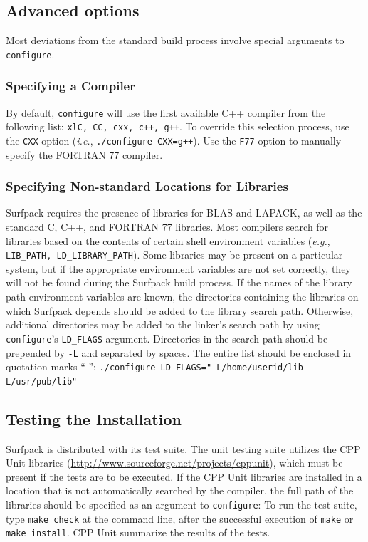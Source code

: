 \documentclass{article}
\begin{document}
\subsection{Advanced options}\label{sec:advancedinstall}
Most deviations from the standard build process involve special arguments to
\texttt{configure}.
\subsubsection{Specifying a Compiler}
By default, \texttt{configure} will use the first available C++ compiler from the
following list: \texttt{xlC, CC, cxx, c++, g++}.  To override this selection process, use
the \texttt{CXX} option ({\em i.e.}, \texttt{./configure CXX=g++}).  Use the \texttt{F77} option to manually specify the FORTRAN 77 compiler.

\subsubsection{Specifying Non-standard Locations for Libraries}
Surfpack requires the presence of libraries for BLAS and LAPACK, as well as the
standard C, C++, and FORTRAN 77 libraries.  Most compilers search for libraries
based on the contents of certain shell environment variables ({\em e.g.}, \texttt{LIB\_PATH,
LD\_LIBRARY\_PATH}).  Some libraries may be present on a particular system, but
if the appropriate environment variables are not set correctly, they will not be
found during the Surfpack build process.  If the names of the library path
environment variables are known, the directories containing the libraries on
which Surfpack depends should be added to the library search path.  Otherwise,
additional directories may be added to the linker's search path by using
\texttt{configure}'s \texttt{LD\_FLAGS} argument.  Directories in the search path should be
prepended by \texttt{-L} and separated by spaces.  The entire list should be enclosed
in quotation marks `` '': 
\texttt{./configure LD\_FLAGS="-L/home/userid/lib -L/usr/pub/lib"}

\subsection{Testing the Installation}
Surfpack is distributed with its test suite.  The unit testing suite utilizes
the CPP Unit libraries (\url{http://www.sourceforge.net/projects/cppunit}), which must be present if the tests are to be executed.  If the CPP Unit libraries are
installed in a location that is not automatically searched by the compiler, the
full path of the libraries should be specified as an argument to \texttt{configure}:
To run the test suite, type \texttt{make check} at the command line, after the
successful execution of \texttt{make} or \texttt{make install}.  CPP Unit
summarize the results of the tests.
\end{document}
